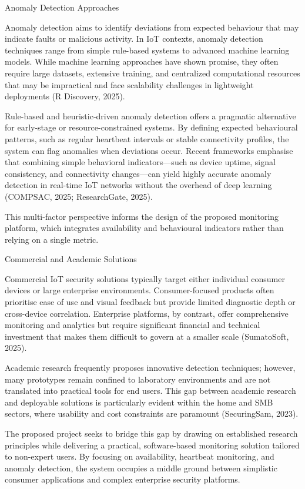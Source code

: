 Anomaly Detection Approaches

Anomaly detection aims to identify deviations from expected behaviour that may indicate faults or malicious activity. In IoT contexts, anomaly detection techniques range from simple rule-based systems to advanced machine learning models. While machine learning approaches have shown promise, they often require large datasets, extensive training, and centralized computational resources that may be impractical and face scalability challenges in lightweight deployments (R Discovery, 2025).

Rule-based and heuristic-driven anomaly detection offers a pragmatic alternative for early-stage or resource-constrained systems. By defining expected behavioural patterns, such as regular heartbeat intervals or stable connectivity profiles, the system can flag anomalies when deviations occur. Recent frameworks emphasise that combining simple behavioral indicators---such as device uptime, signal consistency, and connectivity changes---can yield highly accurate anomaly detection in real-time IoT networks without the overhead of deep learning (COMPSAC, 2025; ResearchGate, 2025). 

This multi-factor perspective informs the design of the proposed monitoring platform, which integrates availability and behavioural indicators rather than relying on a single metric.

Commercial and Academic Solutions

Commercial IoT security solutions typically target either individual consumer devices or large enterprise environments. Consumer-focused products often prioritise ease of use and visual feedback but provide limited diagnostic depth or cross-device correlation. Enterprise platforms, by contrast, offer comprehensive monitoring and analytics but require significant financial and technical investment that makes them difficult to govern at a smaller scale (SumatoSoft, 2025).

Academic research frequently proposes innovative detection techniques; however, many prototypes remain confined to laboratory environments and are not translated into practical tools for end users. This gap between academic research and deployable solutions is particularly evident within the home and SMB sectors, where usability and cost constraints are paramount (SecuringSam, 2023).

The proposed project seeks to bridge this gap by drawing on established research principles while delivering a practical, software-based monitoring solution tailored to non-expert users. By focusing on availability, heartbeat monitoring, and anomaly detection, the system occupies a middle ground between simplistic consumer applications and complex enterprise security platforms.

